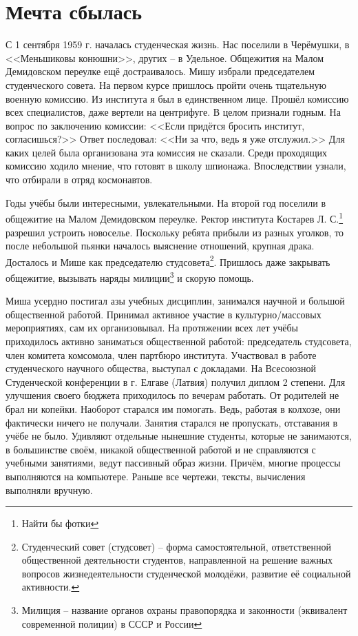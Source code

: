 ﻿\chapter{Мечта сбылась}

С 1 сентября 1959 г. началась студенческая жизнь. Нас поселили в Черёмушки, в <<Меньшиковы конюшни>>, других \--- в Удельное. Общежития на Малом Демидовском переулке ещё достраивалось. Мишу избрали председателем студенческого совета. На первом курсе пришлось пройти очень тщательную военную комиссию. Из института я был в единственном лице. Прошёл комиссию всех специалистов, даже вертели на центрифуге. В целом признали годным. На вопрос по заключению комиссии: <<Если придётся бросить институт, согласишься?>> Ответ последовал: <<Ни за что, ведь я уже отслужил.>> Для каких целей была организована эта комиссия не сказали. Среди проходящих комиссию ходило мнение, что готовят в школу шпионажа. Впоследствии узнали, что отбирали в отряд космонавтов.

Годы учёбы были интересными, увлекательными. На второй год поселили в общежитие на Малом Демидовском переулке. Ректор института Костарев Л. С.\footnote{Найти бы фотки} разрешил устроить новоселье. Поскольку ребята прибыли из разных уголков, то после небольшой пьянки началось выяснение отношений, крупная драка. Досталось и Мише как председателю студсовета\footnote{Студенческий совет (студсовет) \--- форма самостоятельной, ответственной общественной деятельности студентов, направленной на решение важных вопросов жизнедеятельности студенческой молодёжи, развитие её социальной активности.}. Пришлось даже закрывать общежитие, вызывать наряды милиции\footnote{Милиция \--- название органов охраны правопорядка и законности (эквивалент современной полиции) в СССР и России} и скорую помощь.

Миша усердно постигал азы учебных дисциплин, занимался научной и большой общественной работой. Принимал активное участие в культурно\-/массовых мероприятиях, сам их организовывал. На протяжении всех лет учёбы приходилось активно заниматься общественной работой: председатель студсовета, член комитета комсомола, член партбюро института. Участвовал в работе студенческого научного общества, выступал с докладами. На Всесоюзной Студенческой конференции в г. Елгаве (Латвия) получил диплом 2 степени. Для улучшения своего бюджета приходилось по вечерам работать. От родителей не брал ни копейки. Наоборот старался им помогать. Ведь, работая в колхозе, они фактически ничего не получали. Занятия старался не пропускать, отставания в учёбе не было. Удивляют отдельные нынешние студенты, которые не занимаются, в большинстве своём, никакой общественной работой и не справляются с учебными занятиями, ведут пассивный образ жизни. Причём, многие процессы выполняются на компьютере. Раньше все чертежи, тексты, вычисления выполняли вручную.

